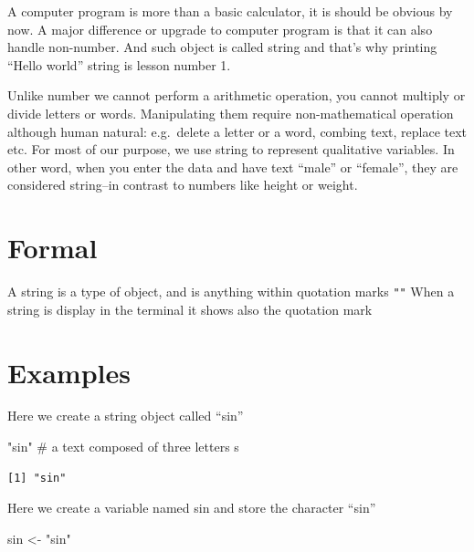 \documentclass[
  letterpaper,
  DIV=11,
  numbers=noendperiod]{scrreprt}
\newenvironment{Shaded}{\begin{snugshade}}{\end{snugshade}}
\newcommand{\CommentTok}[1]{\textcolor[rgb]{0.37,0.37,0.37}{#1}}
\newcommand{\NormalTok}[1]{\textcolor[rgb]{0.00,0.23,0.31}{#1}}
\newcommand{\OtherTok}[1]{\textcolor[rgb]{0.00,0.23,0.31}{#1}}
\newcommand{\StringTok}[1]{\textcolor[rgb]{0.13,0.47,0.30}{#1}}
\begin{document}
A computer program is more than a basic calculator, it is should be
obvious by now. A major difference or upgrade to computer program is
that it can also handle non-number. And such object is called string and
that's why printing ``Hello world'' string is lesson number 1.

Unlike number we cannot perform a arithmetic operation, you cannot
multiply or divide letters or words. Manipulating them require
non-mathematical operation although human natural: e.g.~delete a letter
or a word, combing text, replace text etc. For most of our purpose, we
use string to represent qualitative variables. In other word, when you
enter the data and have text ``male'' or ``female'', they are considered
string--in contrast to numbers like height or weight.

\section*{Formal}\label{formal-31}


A string is a type of object, and is anything within quotation marks
\texttt{""} When a string is display in the terminal it shows also the
quotation mark

\section*{Examples}\label{examples-30}


Here we create a string object called ``sin''

\begin{Shaded}
\begin{Highlighting}[]
\StringTok{"sin"} \CommentTok{\# a text composed of three letters s}
\end{Highlighting}
\end{Shaded}

\begin{verbatim}
[1] "sin"
\end{verbatim}

Here we create a variable named sin and store the character ``sin''

\begin{Shaded}
\begin{Highlighting}[]
\NormalTok{sin }\OtherTok{\textless{}{-}} \StringTok{"sin"}
\end{Highlighting}
\end{Shaded}
\end{document}
